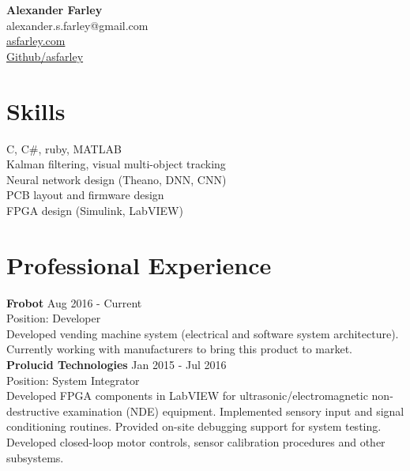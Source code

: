 \documentclass{article}
\begin{document}
\thispagestyle{empty}
\sffamily 

\hspace*{1 in} \large \textbf{Alexander Farley} \normalsize \\
\hspace*{1 in} alexander.s.farley@gmail.com \\
\hspace*{1 in} \href{http://asfarley.com}{asfarley.com} \\
\hspace*{1 in} \color{blue} \href{https://github.com/asfarley}{Github/asfarley} \color{black} 

\section*{\large Skills \normalsize}
\begin{multicols}{2}
C, C\#, ruby, MATLAB \\
Kalman filtering, visual multi-object tracking \\ 
Neural network design (Theano, DNN, CNN) \\
PCB layout and firmware design \\
FPGA design (Simulink, LabVIEW) \\
\end{multicols}

\section*{\large Professional Experience \normalsize}

\textbf{Frobot} \hrulefill Aug 2016 - Current \\
\small Position: Developer \\
Developed vending machine system (electrical and software system architecture). Currently working with manufacturers to bring this product to market. 
\normalsize \\

\textbf{Prolucid Technologies} \hrulefill Jan 2015 - Jul 2016 \\
\small Position: System Integrator \\
Developed FPGA components in LabVIEW for ultrasonic/electromagnetic non-destructive examination (NDE) equipment. Implemented sensory input and signal conditioning routines. Provided on-site debugging support for system testing.  Developed closed-loop motor controls, sensor calibration procedures and other subsystems. \\
\end{document}

